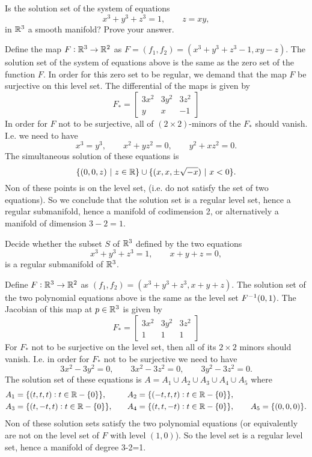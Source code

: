\begin{problem}
	Is the solution set of the system of equations 
	\[ x^3 + y^3 + z^3 = 1, \qquad z = xy, \]
	in $ \mathbb{R}^3 $ a smooth manifold? Prove your answer. 
\end{problem}
\begin{solution}
	Define the map $ F: \mathbb{R}^3 \to \mathbb{R}^2 $ as $ F = (f_1,f_2) = (x^3+y^3+z^3-1, xy-z) $. The solution set of the system of equations above is the same as the zero set of the function $ F $. In order for this zero set to be regular, we demand that the map $ F $ be surjective on this level set. The differential of the maps is given by 
	\[ F_* = \begin{bmatrix}
		3x^2 & 3y^2 & 3z^2 \\
		y & x & -1
	\end{bmatrix} \]
	In order for $ F $ not to be surjective, all of $ (2\times 2)\text{-minors} $ of the $ F_* $ should vanish. I.e. we need to have
	\[ x^3 = y^3, \qquad x^2+yz^2 = 0,\qquad y^2+xz^2 = 0. \]
	The simultaneous solution of these equations is 
	\[ \{(0,0,z)\ |\ z \in \mathbb{R}\} \cup \{(x,x,\pm\sqrt{-x})\ |\  x<0\}. \]
	Non of these points is on the level set, (i.e. do not satisfy the set of two equations). So we conclude that the solution set is a regular level set, hence a regular submanifold, hence a manifold of codimension 2, or alternatively a manifold of dimension $ 3-2=1 $.
\end{solution}


\begin{problem}
	Decide whether the subset $ S $ of $ \mathbb{R}^3 $ defined by the two equations
	\[ x^3 + y^3 + z^3 = 1, \qquad x+y+z = 0, \]
	is a regular submanifold of $ \mathbb{R}^3 $.
\end{problem}
\begin{solution}
	Define $ F:\mathbb{R}^3 \to \mathbb{R}^2 $ as $ (f_1, f_2) = (x^3+y^3+z^3, x+y+z) $. The solution set of the two polynomial equations above is the same as the level set $ F^{-1}(0,1) $. The Jacobian of this map at $ p \in \mathbb{R}^3 $ is given by
	\[ F_* = \begin{bmatrix}
		3x^2 & 3y^2 & 3z^2 \\
		1 & 1 & 1
	\end{bmatrix} \]
	For $ F_* $ not to be surjective on the level set, then all of its $ 2\times 2 $ minors should vanish. I.e. in order for $ F_* $ not to be surjective we need to have
	\[ 3x^2 - 3y^2 = 0, \qquad 3x^2 - 3z^2 = 0, \qquad 3y^2 - 3z^2 = 0. \]
	The solution set of these equations is $ A = A_1 \cup A_2 \cup A_3 \cup A_4 \cup A_5 $ where
	\begin{align*}
		&A_1 = \{(t,t,t): t\in \mathbb{R}-\{0\}\},\quad &&A_2 = \{(-t,t,t): t\in \mathbb{R}-\{0\}\},\\
		&A_3 = \{(t,-t,t): t\in \mathbb{R}-\{0\}\},\quad &&A_4 = \{(t,t,-t): t\in \mathbb{R}-\{0\}\},\qquad A_5=\{(0,0,0)\}.
	\end{align*}
	Non of these solution sets satisfy the two polynomial equations (or equivalently are not on the level set of $ F $ with level $ (1,0) $). So the level set is a regular level set, hence a manifold of degree 3-2=1. 
\end{solution}


